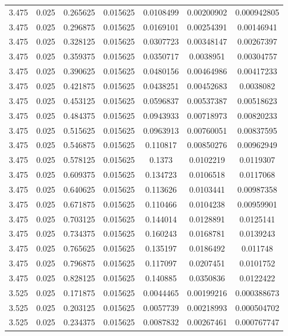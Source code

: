 \begin{table}[bh]
\begin{center}
{\begin{tabular}{ccccccc}
3.475	 & 0.025 & 	0.265625	 & 0.015625	 & 0.0108499	 & 0.00200902	 & 0.000942805 \\ 
3.475	 & 0.025 & 	0.296875	 & 0.015625	 & 0.0169101	 & 0.00254391	 & 0.00146941 \\ 
3.475	 & 0.025 & 	0.328125	 & 0.015625	 & 0.0307723	 & 0.00348147	 & 0.00267397 \\ 
3.475	 & 0.025 & 	0.359375	 & 0.015625	 & 0.0350717	 & 0.0038951	 & 0.00304757 \\ 
3.475	 & 0.025 & 	0.390625	 & 0.015625	 & 0.0480156	 & 0.00464986	 & 0.00417233 \\ 
3.475	 & 0.025 & 	0.421875	 & 0.015625	 & 0.0438251	 & 0.00452683	 & 0.0038082 \\ 
3.475	 & 0.025 & 	0.453125	 & 0.015625	 & 0.0596837	 & 0.00537387	 & 0.00518623 \\ 
3.475	 & 0.025 & 	0.484375	 & 0.015625	 & 0.0943933	 & 0.00718973	 & 0.00820233 \\ 
3.475	 & 0.025 & 	0.515625	 & 0.015625	 & 0.0963913	 & 0.00760051	 & 0.00837595 \\ 
3.475	 & 0.025 & 	0.546875	 & 0.015625	 & 0.110817	 & 0.00850276	 & 0.00962949 \\ 
3.475	 & 0.025 & 	0.578125	 & 0.015625	 & 0.1373	 & 0.0102219	 & 0.0119307 \\ 
3.475	 & 0.025 & 	0.609375	 & 0.015625	 & 0.134723	 & 0.0106518	 & 0.0117068 \\ 
3.475	 & 0.025 & 	0.640625	 & 0.015625	 & 0.113626	 & 0.0103441	 & 0.00987358 \\ 
3.475	 & 0.025 & 	0.671875	 & 0.015625	 & 0.110466	 & 0.0104238	 & 0.00959901 \\ 
3.475	 & 0.025 & 	0.703125	 & 0.015625	 & 0.144014	 & 0.0128891	 & 0.0125141 \\ 
3.475	 & 0.025 & 	0.734375	 & 0.015625	 & 0.160243	 & 0.0168781	 & 0.0139243 \\ 
3.475	 & 0.025 & 	0.765625	 & 0.015625	 & 0.135197	 & 0.0186492	 & 0.011748 \\ 
3.475	 & 0.025 & 	0.796875	 & 0.015625	 & 0.117097	 & 0.0207451	 & 0.0101752 \\ 
3.475	 & 0.025 & 	0.828125	 & 0.015625	 & 0.140885	 & 0.0350836	 & 0.0122422 \\ 
3.525	 & 0.025 & 	0.171875	 & 0.015625	 & 0.0044465	 & 0.00199216	 & 0.000388673 \\ 
3.525	 & 0.025 & 	0.203125	 & 0.015625	 & 0.0057739	 & 0.00218993	 & 0.000504702 \\ 
3.525	 & 0.025 & 	0.234375	 & 0.015625	 & 0.0087832	 & 0.00267461	 & 0.000767747 \\ 

\end{tabular}}
\end{center}
\end{table}
